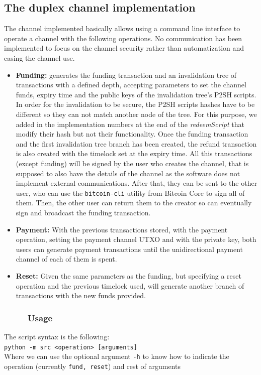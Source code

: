 \documentclass[12pt,journal,compsoc]{IEEEtran}
\newcommand{\code}[1]{\texttt{#1}}
\begin{document}
\subsection{The duplex channel implementation}
The channel implemented basically allows using a command line interface to operate a channel with the following operations. No communication has been implemented to focus on the channel security rather than automatization and easing the channel use.
\begin{itemize}
    \item \textbf{Funding:} generates the funding transaction and an invalidation tree of transactions with a defined depth, accepting parameters to set the channel funds, expiry time and the public keys of the invalidation tree's P2SH scripts. In order for the invalidation to be secure, the P2SH scripts hashes have to be different so they can not match another node of the tree. For this purpose, we added in the implementation numbers at the end of the \textit{redeemScript} that modify their hash but not their functionality. Once the funding transaction and the first invalidation tree branch has been created, the refund transaction is also created with the timelock set at the expiry time. All this transactions (except funding) will be signed by the user who creates the channel, that is supposed to also have the details of the channel as the software does not implement external communications. After that, they can be sent to the other user, who can use the \code{bitcoin-cli} utility from Bitcoin Core\cite{bitcoin-core} to sign all of them. Then, the other user can return them to the creator so can eventually sign and broadcast the funding transaction.
    \item \textbf{Payment:} With the previous transactions stored, with the payment operation, setting the payment channel UTXO and with the private key, both users can generate payment transactions until the unidirectional payment channel of each of them is spent.
    \item \textbf{Reset:} Given the same parameters as the funding, but specifying a reset operation and the previous timelock used, will generate another branch of transactions with the new funds provided.
\end{itemize}
\subsubsection{\ \ \ \ \ Usage}
The script syntax is the following:\\
\code{python -m src <operation> [arguments]}\\
Where we can use the optional argument \code{-h} to know how to indicate the operation (currently \code{fund, reset}) and rest of arguments
\end{document}
